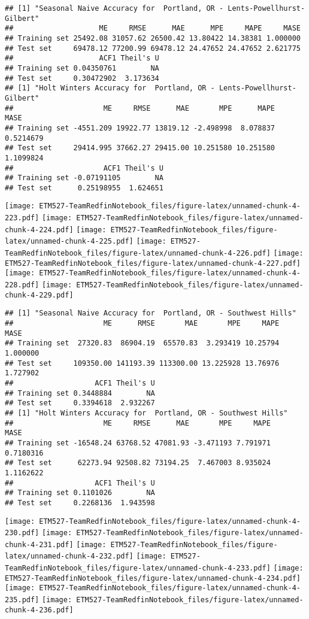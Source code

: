 \documentclass[]{article}
\begin{document}
\begin{verbatim}
## [1] "Seasonal Naive Accuracy for  Portland, OR - Lents-Powellhurst-Gilbert"
##                    ME     RMSE      MAE      MPE     MAPE     MASE
## Training set 25492.08 31057.62 26500.42 13.80422 14.38381 1.000000
## Test set     69478.12 77200.99 69478.12 24.47652 24.47652 2.621775
##                    ACF1 Theil's U
## Training set 0.04350761        NA
## Test set     0.30472902  3.173634
## [1] "Holt Winters Accuracy for  Portland, OR - Lents-Powellhurst-Gilbert"
##                     ME     RMSE      MAE       MPE      MAPE      MASE
## Training set -4551.209 19922.77 13819.12 -2.498998  8.078837 0.5214679
## Test set     29414.995 37662.27 29415.00 10.251580 10.251580 1.1099824
##                     ACF1 Theil's U
## Training set -0.07191105        NA
## Test set      0.25198955  1.624651
\end{verbatim}

\texttt{[image: ETM527-TeamRedfinNotebook\_files/figure-latex/unnamed-chunk-4-223.pdf]}
\texttt{[image: ETM527-TeamRedfinNotebook\_files/figure-latex/unnamed-chunk-4-224.pdf]}
\texttt{[image: ETM527-TeamRedfinNotebook\_files/figure-latex/unnamed-chunk-4-225.pdf]}
\texttt{[image: ETM527-TeamRedfinNotebook\_files/figure-latex/unnamed-chunk-4-226.pdf]}
\texttt{[image: ETM527-TeamRedfinNotebook\_files/figure-latex/unnamed-chunk-4-227.pdf]}
\texttt{[image: ETM527-TeamRedfinNotebook\_files/figure-latex/unnamed-chunk-4-228.pdf]}
\texttt{[image: ETM527-TeamRedfinNotebook\_files/figure-latex/unnamed-chunk-4-229.pdf]}

\begin{verbatim}
## [1] "Seasonal Naive Accuracy for  Portland, OR - Southwest Hills"
##                     ME      RMSE       MAE       MPE     MAPE     MASE
## Training set  27320.83  86904.19  65570.83  3.293419 10.25794 1.000000
## Test set     109350.00 141193.39 113300.00 13.225928 13.76976 1.727902
##                   ACF1 Theil's U
## Training set 0.3448884        NA
## Test set     0.3394618  2.932267
## [1] "Holt Winters Accuracy for  Portland, OR - Southwest Hills"
##                     ME     RMSE      MAE       MPE     MAPE      MASE
## Training set -16548.24 63768.52 47081.93 -3.471193 7.791971 0.7180316
## Test set      62273.94 92508.82 73194.25  7.467003 8.935024 1.1162622
##                   ACF1 Theil's U
## Training set 0.1101026        NA
## Test set     0.2268136  1.943598
\end{verbatim}

\texttt{[image: ETM527-TeamRedfinNotebook\_files/figure-latex/unnamed-chunk-4-230.pdf]}
\texttt{[image: ETM527-TeamRedfinNotebook\_files/figure-latex/unnamed-chunk-4-231.pdf]}
\texttt{[image: ETM527-TeamRedfinNotebook\_files/figure-latex/unnamed-chunk-4-232.pdf]}
\texttt{[image: ETM527-TeamRedfinNotebook\_files/figure-latex/unnamed-chunk-4-233.pdf]}
\texttt{[image: ETM527-TeamRedfinNotebook\_files/figure-latex/unnamed-chunk-4-234.pdf]}
\texttt{[image: ETM527-TeamRedfinNotebook\_files/figure-latex/unnamed-chunk-4-235.pdf]}
\texttt{[image: ETM527-TeamRedfinNotebook\_files/figure-latex/unnamed-chunk-4-236.pdf]}
\end{document}
